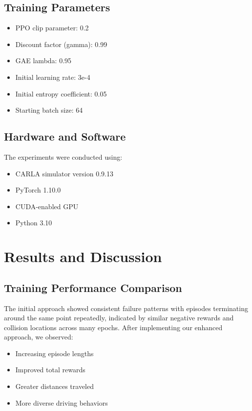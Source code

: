 \documentclass[11pt,a4paper]{article}
\begin{document}
\subsection{Training Parameters}
\begin{itemize}
    \item PPO clip parameter: 0.2
    \item Discount factor (gamma): 0.99
    \item GAE lambda: 0.95
    \item Initial learning rate: 3e-4
    \item Initial entropy coefficient: 0.05
    \item Starting batch size: 64
\end{itemize}

\subsection{Hardware and Software}
The experiments were conducted using:
\begin{itemize}
    \item CARLA simulator version 0.9.13
    \item PyTorch 1.10.0
    \item CUDA-enabled GPU
    \item Python 3.10
\end{itemize}

\section{Results and Discussion}

\subsection{Training Performance Comparison}
The initial approach showed consistent failure patterns with episodes terminating around the same point repeatedly, indicated by similar negative rewards and collision locations across many epochs. After implementing our enhanced approach, we observed:
\begin{itemize}
    \item Increasing episode lengths
    \item Improved total rewards
    \item Greater distances traveled
    \item More diverse driving behaviors
\end{itemize}
\end{document}
